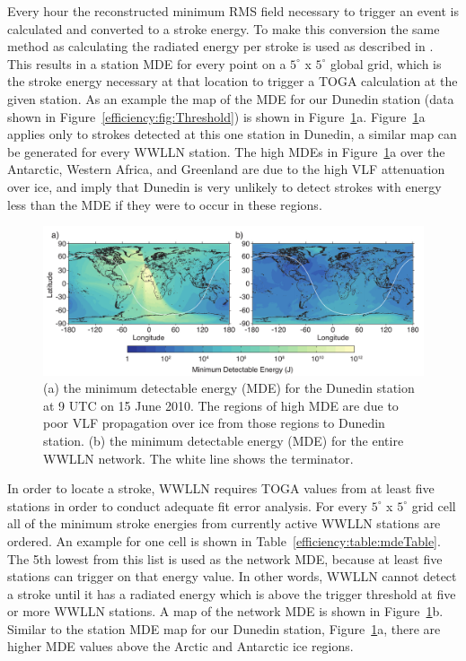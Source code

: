 Every hour the reconstructed minimum RMS field necessary to trigger an event is calculated and converted to a stroke energy.
To make this conversion the same method as calculating the radiated energy per stroke is used as described in \citet{Hutchins2012}.
This results in a station MDE for every point on a $5^\circ$ x $5^\circ$ global grid, which is the stroke energy necessary at that location to trigger a TOGA calculation at the given station.
As an example the map of the MDE for our Dunedin station (data shown in Figure~\ref{efficiency:fig:Threshold}) is shown in Figure~\ref{efficiency:fig:Threshold_Map}a.
Figure~\ref{efficiency:fig:Threshold_Map}a applies only to strokes detected at this one station in Dunedin, a similar map can be generated for every WWLLN station.
The high MDEs in Figure~\ref{efficiency:fig:Threshold_Map}a over the Antarctic, Western Africa, and Greenland are due to the high VLF attenuation over ice, and imply that Dunedin is very unlikely to detect strokes with energy less than the MDE if they were to occur in these regions.

\begin{figure}[ht!]
   \centering
\noindent\includegraphics[scale=0.8]{efficiency/Figures/2012RS005049-p3.pdf}
   \caption{(a) the minimum detectable energy (MDE) for the Dunedin station at 9 UTC on 15 June 2010.
   The regions of high MDE are due to poor VLF propagation over ice from those regions to Dunedin station.
   (b) the minimum detectable energy (MDE) for the entire WWLLN network.
   The white line shows the terminator.}
   \label{efficiency:fig:Threshold_Map}
\end{figure}

In order to locate a stroke, WWLLN requires TOGA values from at least five stations in order to conduct adequate fit error analysis.
For every $5^\circ$ x $5^\circ$ grid cell all of the minimum stroke energies from currently active WWLLN stations are ordered.
An example for one cell is shown in Table~\ref{efficiency:table:mdeTable}.
The 5th lowest from this list is used as the network MDE, because at least five stations can trigger on that energy value.
In other words, WWLLN cannot detect a stroke until it has a radiated energy which is above the trigger threshold at five or more WWLLN stations.
A map of the network MDE is shown in Figure~\ref{efficiency:fig:Threshold_Map}b.
Similar to the station MDE map for our Dunedin station, Figure~\ref{efficiency:fig:Threshold_Map}a, there are higher MDE values above the Arctic and Antarctic ice regions.

